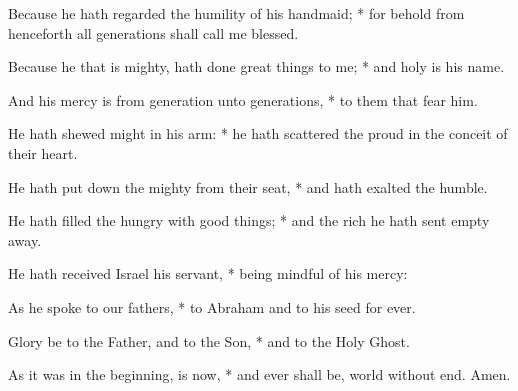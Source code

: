 ﻿\setcounter{enumi}{2}
\item  Because he hath regarded the humility of his handmaid; * for behold from henceforth all generations shall call me blessed.
\item  Because he that is mighty, hath done great things to me; * and holy is his name.
\item  And his mercy is from generation unto generations, * to them that fear him.
\item  He hath shewed might in his arm: * he hath scattered the proud in the conceit of their heart.
\item  He hath put down the mighty from their seat, * and hath exalted the humble.
\item  He hath filled the hungry with good things; * and the rich he hath sent empty away.
\item  He hath received Israel his servant, * being mindful of his mercy:
\item  As he spoke to our fathers, * to Abraham and to his seed for ever.
\item  Glory be to the Father, and to the Son, * and to the Holy Ghost.
\item  As it was in the beginning, is now, * and ever shall be, world without end. Amen.